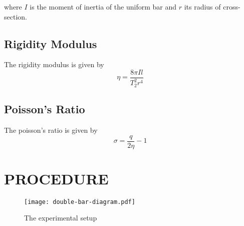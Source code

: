 \documentclass[12pt,a4paper]{article}
\begin{document}
			where $I$ is the moment of inertia of the uniform bar and $r$ its radius of cross-section.
			
		\subsection{Rigidity Modulus}
			
			The rigidity modulus is given by
				\begin{equation}
				\eta=\dfrac{8\pi Il}{T^{2}_{2}r^{4}}
				\end{equation}
		
		\subsection{Poisson's Ratio}
			The poisson's ratio is given by
			\begin{equation}
				\sigma = \dfrac{q}{2\eta} - 1
			\end{equation}
	\section{PROCEDURE}
		
		\begin{figure}[!htb]
			\centering
			\texttt{[image: double-bar-diagram.pdf]}
			\caption{The experimental setup}
		\end{figure}
\end{document}
